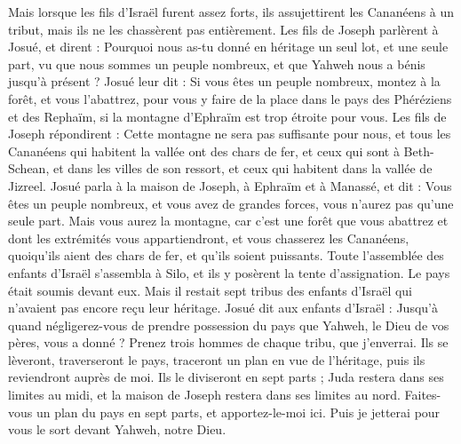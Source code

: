\begin{multicols}{2}
Mais lorsque les fils d’Israël furent assez forts, ils assujettirent les Cananéens à un tribut, mais ils ne les chassèrent pas entièrement.
Les fils de Joseph parlèrent à Josué, et dirent : Pourquoi nous as-tu donné en héritage un seul lot, et une seule part, vu que nous sommes un peuple nombreux, et que Yahweh nous a bénis jusqu’à présent ?
Josué leur dit : Si vous êtes un peuple nombreux, montez à la forêt, et vous l’abattrez, pour vous y faire de la place dans le pays des Phéréziens et des Rephaïm, si la montagne d’Ephraïm est trop étroite pour vous.
Les fils de Joseph répondirent : Cette montagne ne sera pas suffisante pour nous, et tous les Cananéens qui habitent la vallée ont des chars de fer, et ceux qui sont à Beth-Schean, et dans les villes de son ressort, et ceux qui habitent dans la vallée de Jizreel.
Josué parla à la maison de Joseph, à Ephraïm et à Manassé, et dit : Vous êtes un peuple nombreux, et vous avez de grandes forces, vous n’aurez pas qu’une seule part.
Mais vous aurez la montagne, car c’est une forêt que vous abattrez et dont les extrémités vous appartiendront, et vous chasserez les Cananéens, quoiqu’ils aient des chars de fer, et qu’ils soient puissants.
\VerseOne{}Toute l’assemblée des enfants d’Israël s’assembla à Silo, et ils y posèrent la tente d’assignation. Le pays était soumis devant eux.
Mais il restait sept tribus des enfants d’Israël qui n’avaient pas encore reçu leur héritage.
Josué dit aux enfants d’Israël : Jusqu’à quand négligerez-vous de prendre possession du pays que Yahweh, le Dieu de vos pères, vous a donné ?
Prenez trois hommes de chaque tribu, que j’enverrai. Ils se lèveront, traverseront le pays, traceront un plan en vue de l’héritage, puis ils reviendront auprès de moi.
Ils le diviseront en sept parts ; Juda restera dans ses limites au midi, et la maison de Joseph restera dans ses limites au nord.
Faites-vous un plan du pays en sept parts, et apportez-le-moi ici. Puis je jetterai pour vous le sort devant Yahweh, notre Dieu.

\end{multicols}
